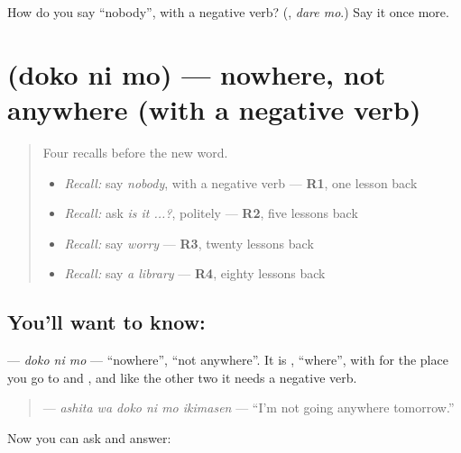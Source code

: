 \begin{tcolorbox}[breakable,colback=teal!4,colframe=teal!35!black,title={Before you move on}]
How do you say \textquotedblleft{}nobody\textquotedblright{}, with a negative verb? (\textbf{}, \emph{dare mo}.) Say it once more.
\end{tcolorbox}
\section[\texorpdfstring{\ja{どこにも} (doko ni mo)}{どこにも (doko ni mo)}]{ (doko ni mo) — nowhere, not anywhere (with a negative verb)}

\label{lesson:JA-C139-dokonimo}



\begin{quote}
Four recalls before the new word.

\begin{itemize}
\raggedright
  \item \emph{Recall:} say \emph{nobody}, with a negative verb — \textbf{R1}, one lesson back
  \item \emph{Recall:} ask \emph{is it ...?}, politely — \textbf{R2}, five lessons back
  \item \emph{Recall:} say \emph{worry} — \textbf{R3}, twenty lessons back
  \item \emph{Recall:} say \emph{a library} — \textbf{R4}, eighty lessons back
\end{itemize}
\end{quote}

\subsection*{You'll want to know: }
\textbf{} — \emph{doko ni mo} — \textquotedblleft{}nowhere\textquotedblright{}, \textquotedblleft{}not anywhere\textquotedblright{}. It is \textbf{}, \textquotedblleft{}where\textquotedblright{}, with \textbf{} for the place you go to and \textbf{}, and like the other two it needs a negative verb.

\begin{quote}
\textbf{  } — \emph{ashita wa doko ni mo ikimasen} — \textquotedblleft{}I'm not going anywhere tomorrow.\textquotedblright{}
\end{quote}

Now you can ask and answer:

